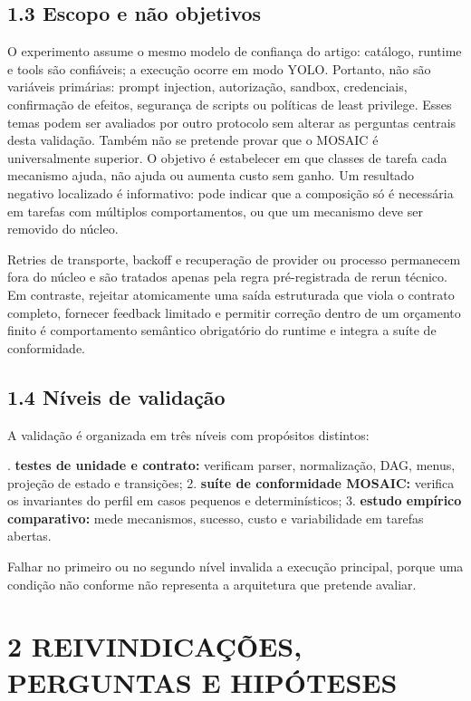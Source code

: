 \documentclass[12pt,a4paper]{article}
\begin{document}
\subsection*{1.3 Escopo e não objetivos}

O experimento assume o mesmo modelo de confiança do artigo: catálogo, runtime e tools são confiáveis; a execução ocorre em modo YOLO. Portanto, não são variáveis primárias: prompt injection, autorização, sandbox, credenciais, confirmação de efeitos, segurança de scripts ou políticas de least privilege. Esses temas podem ser avaliados por outro protocolo sem alterar as perguntas centrais desta validação. Também não se pretende provar que o MOSAIC é universalmente superior. O objetivo é estabelecer em que classes de tarefa cada mecanismo ajuda, não ajuda ou aumenta custo sem ganho. Um resultado negativo localizado é informativo: pode indicar que a composição só é necessária em tarefas com múltiplos comportamentos, ou que um mecanismo deve ser removido do núcleo.

Retries de transporte, backoff e recuperação de provider ou processo permanecem fora do núcleo e são tratados apenas pela regra pré-registrada de rerun técnico. Em contraste, rejeitar atomicamente uma saída estruturada que viola o contrato completo, fornecer feedback limitado e permitir correção dentro de um orçamento finito é comportamento semântico obrigatório do runtime e integra a suíte de conformidade.


\subsection*{1.4 Níveis de validação}

A validação é organizada em três níveis com propósitos distintos:


.\textbf{ testes de unidade e contrato:} verificam parser, normalização, DAG, menus, projeção de estado e transições; 2.\textbf{ suíte de conformidade MOSAIC:} verifica os invariantes do perfil em casos pequenos e determinísticos; 3.\textbf{ estudo empírico comparativo:} mede mecanismos, sucesso, custo e variabilidade em tarefas abertas.\par

Falhar no primeiro ou no segundo nível invalida a execução principal, porque uma condição não conforme não representa a arquitetura que pretende avaliar.



\section*{2 REIVINDICAÇÕES, PERGUNTAS E HIPÓTESES}
\end{document}
